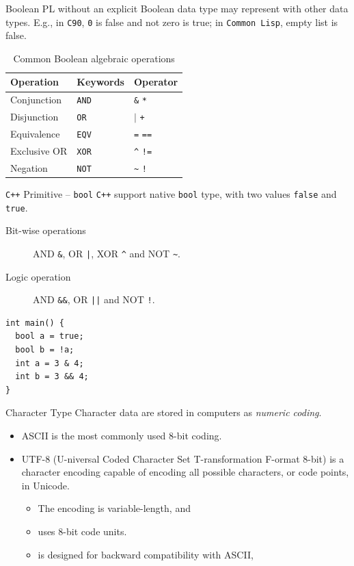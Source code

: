 \documentclass[presentation]{beamer}
\begin{document}
\begin{frame}[fragile,label={sec:orgheadline11}]{Boolean}
 PL without an explicit Boolean data type may represent with other
data types.  E.g., in \texttt{C90}, \texttt{0} is false and not zero is true; in
\texttt{Common Lisp}, empty list is false.

\begin{table}[htb]
\caption{Common Boolean algebraic operations}
\centering
\begin{tabular}{lll}
Operation & Keywords & Operator\\
\hline
Conjunction & \texttt{AND} & \texttt{\&} \texttt{*}\\
Disjunction & \texttt{OR} & \(\mid\) \texttt{+}\\
Equivalence & \texttt{EQV} & \texttt{=} \texttt{==}\\
Exclusive OR & \texttt{XOR} & \texttt{\textasciicircum{}} \texttt{!=}\\
Negation & \texttt{NOT} & \texttt{\textasciitilde{}} \texttt{!}\\
\end{tabular}
\end{table}
\end{frame}

\begin{frame}[fragile,label={sec:orgheadline12}]{\texttt{C++} Primitive -- \texttt{bool}}
 \texttt{C++} support native \texttt{bool} type, with two values \texttt{false} and
\texttt{true}.

\begin{description}
\item[{Bit-wise operations}] AND \texttt{\&}, OR \texttt{|}, XOR \texttt{\textasciicircum{}} and NOT \texttt{\textasciitilde{}}.
\item[{Logic operation}] AND \texttt{\&\&}, OR \texttt{||} and NOT \texttt{!}.
\end{description}


\begin{verbatim}
int main() {
  bool a = true;
  bool b = !a;
  int a = 3 & 4;
  int b = 3 && 4;
}
\end{verbatim}
\end{frame}

\begin{frame}[label={sec:orgheadline13}]{Character Type}
Character data are stored in computers as \emph{numeric coding}.

\begin{itemize}
\item ASCII is the most commonly used 8-bit coding.
\item UTF-8 (\alert{U}-niversal Coded Character Set \alert{T}-ransformation
\alert{F}-ormat \alert{8}-bit) is a character encoding capable of encoding
all possible characters, or code points, in Unicode.
\begin{itemize}
\item The encoding is variable-length, and
\item uses 8-bit code units.
\item is designed for backward compatibility with ASCII,
\end{itemize}
\end{itemize}
\end{frame}
\end{document}
